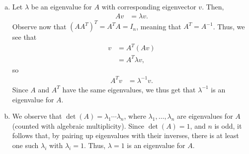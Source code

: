 \documentclass[10pt]{mypackage}
\begin{document}
\begin{solution}\hfill
  \begin{enumerate}[(a)]
    \item Let $\lambda$ be an eigenvalue for $A$ with corresponding eigenvector $v$. Then,
      \begin{align*}
        Av &= \lambda v.
      \end{align*}
      Observe now that $\left( AA^{T} \right)^{T} = A^{T}A = I_n$, meaning that $A^{T} = A^{-1}$. Thus, we see that
      \begin{align*}
        v &= A^{T}\left( Av \right)\\
          &= A^{T}\lambda v,
      \end{align*}
      so
      \begin{align*}
        A^{T}v &= \lambda^{-1}v.
      \end{align*}
      Since $A$ and $A^{T}$ have the same eigenvalues, we thus get that $\lambda^{-1}$ is an eigenvalue for $A$.
    \item We observe that $\det\left( A \right) = \lambda_1\cdots\lambda_n$, where $\lambda_1,\dots,\lambda_n$ are eigenvalues for $A$ (counted with algebraic multiplicity). Since $\det\left( A \right) = 1$, and $n$ is odd, it follows that, by pairing up eigenvalues with their inverses, there is at least one such $\lambda_i$ with $\lambda_i = 1$. Thus, $\lambda = 1$ is an eigenvalue for $A$.
  \end{enumerate}
\end{solution}
\end{document}
